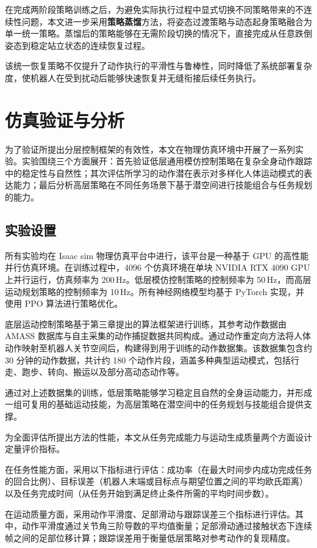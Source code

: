 在完成两阶段策略训练之后，为避免实际执行过程中显式切换不同策略带来的不连续性问题，本文进一步采用\textbf{策略蒸馏}方法，将姿态过渡策略与动态起身策略融合为单一统一策略。蒸馏后的策略能够在无需阶段切换的情况下，直接完成从任意跌倒姿态到稳定站立状态的连续恢复过程。

该统一恢复策略不仅提升了动作执行的平滑性与鲁棒性，同时降低了系统部署复杂度，使机器人在受到扰动后能够快速恢复并无缝衔接后续任务执行。


\section{仿真验证与分析}

为了验证所提出分层控制框架的有效性，本文在物理仿真环境中开展了一系列实验。实验围绕三个方面展开：首先验证低层通用模仿控制策略在复杂全身动作跟踪中的稳定性与自然性；其次评估所学习的动作潜在表示对多样化人体运动模式的表达能力；最后分析高层策略在不同任务场景下基于潜空间进行技能组合与任务规划的能力。

\subsection{实验设置}

所有实验均在 Isaac sim 物理仿真平台中进行，该平台是一种基于 GPU 的高性能并行仿真环境。在训练过程中，4096 个仿真环境在单块 NVIDIA RTX 4090 GPU 上并行运行，仿真频率为 200\,Hz。低层模仿控制策略的控制频率为 50\,Hz，而高层运动规划策略的控制频率为 10\,Hz。所有神经网络模型均基于 PyTorch 实现，并使用 PPO 算法进行策略优化。

底层运动控制策略基于第三章提出的算法框架进行训练，其参考动作数据由 AMASS 数据库与自主采集的动作捕捉数据共同构成。通过动作重定向方法将人体动作映射至机器人关节空间后，构建得到用于训练的动作数据集。该数据集包含约 30 分钟的动作数据，共计约 180 个动作片段，涵盖多种典型运动模式，包括行走、跑步、转向、搬运以及部分高动态动作等。

通过对上述数据集的训练，低层策略能够学习稳定且自然的全身运动能力，并形成一组可复用的基础运动技能，为高层策略在潜空间中的任务规划与技能组合提供支撑。


为全面评估所提出方法的性能，本文从任务完成能力与运动生成质量两个方面设计定量评价指标。

在任务性能方面，采用以下指标进行评估：成功率（在最大时间步内成功完成任务的回合比例）、目标误差（机器人末端或目标点与期望位置之间的平均欧氏距离）以及任务完成时间（从任务开始到满足终止条件所需的平均时间步数）。

在运动质量方面，采用动作平滑度、足部滑动与跟踪误差三个指标进行评估。其中，动作平滑度通过关节角三阶导数的平均值衡量；足部滑动通过接触状态下连续帧之间的足部位移计算；跟踪误差用于衡量低层策略对参考动作的复现精度。

